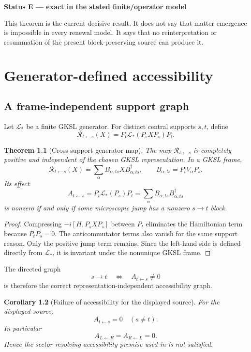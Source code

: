 \documentclass[11pt,oneside,openany]{book}
\numberwithin{equation}{chapter}
\newtheorem{theorem}{Theorem}[chapter]
\newtheorem{corollary}[theorem]{Corollary}
\theoremstyle{definition}
\theoremstyle{remark}
\newenvironment{statusbox}[2]{%
  \par\medskip\noindent
  \begin{center}\begin{minipage}{0.94\textwidth}
  \colorbox{#1!8}{\parbox{\dimexpr\linewidth-2\fboxsep\relax}{\textbf{#2}}}\par\smallskip
}{%
  \end{minipage}\end{center}\medskip
}
\newcommand{\Exact}[1]{\begin{statusbox}{ExactColor}{Status E --- exact in the stated finite/operator model}#1\end{statusbox}}
\begin{document}
\Exact{This theorem is the current decisive result.  It does not say that matter emergence is impossible in every renewal model.  It says that no reinterpretation or resummation of the present block-preserving source can produce it.}

\chapter{Generator-defined accessibility}
\label{ch:accessibility}

\section{A frame-independent support graph}
Let $\mathcal L_*$ be a finite GKSL generator.  For distinct central supports $s,t$, define
\[
 \mathcal R_{t\leftarrow s}(X)
 =P_t\mathcal L_*(P_sXP_s)P_t.
\]

\begin{theorem}[Cross-support generator map]
\label{thm:generator-cross-map}
The map $\mathcal R_{t\leftarrow s}$ is completely positive and independent of the chosen GKSL representation.  In a GKSL frame,
\[
 \boxed{
 \mathcal R_{t\leftarrow s}(X)
 =\sum_\alpha B_{\alpha,ts}XB_{\alpha,ts}^\dagger,
 \qquad
 B_{\alpha,ts}=P_tV_\alpha P_s.
 }
\]
Its effect
\[
 \boxed{
 A_{t\leftarrow s}
 =P_t\mathcal L_*(P_s)P_t
 =\sum_\alpha B_{\alpha,ts}B_{\alpha,ts}^\dagger
 }
\]
is nonzero if and only if some microscopic jump has a nonzero $s\to t$ block.
\end{theorem}

\begin{proof}
Compressing $-i[H,P_sXP_s]$ between $P_t$ eliminates the Hamiltonian term because $P_tP_s=0$.  The anticommutator terms also vanish for the same support reason.  Only the positive jump term remains.  Since the left-hand side is defined directly from $\mathcal L_*$, it is invariant under the nonunique GKSL frame.
\end{proof}

The directed graph
\[
 s\to t\quad\Longleftrightarrow\quad A_{t\leftarrow s}\ne0
\]
is therefore the correct representation-independent accessibility graph.

\begin{corollary}[Failure of accessibility for the displayed source]
For the displayed source,
\[
 \boxed{A_{t\leftarrow s}=0\quad(s\ne t).}
\]
In particular
\[
 A_{L\leftarrow R}=A_{R\leftarrow L}=0.
\]
Hence the sector-resolving accessibility premise used in  is not satisfied.
\end{corollary}
\end{document}
